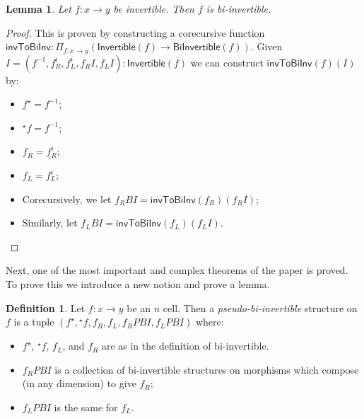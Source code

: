 \documentclass{article}
\newtheorem{lemma}{Lemma}
\theoremstyle{definition}
\newtheorem{definition}{Definition}
\theoremstyle{remark}
\newcommand{\linv}[1]{{}^\star\!#1}
\newcommand{\rinv}[1]{#1^\star}
\newcommand{\inv}[1]{#1^{-1}}
\begin{document}
\begin{lemma}\label{inv-to-bi-inv}
  Let \(f : x \to y\) be invertible. Then \(f\) is bi-invertible.
\end{lemma}

\begin{proof}
  This is proven by constructing a corecursive function \(\mathsf{invToBiInv} : \Pi_{f : x \to y} (\mathsf{Invertible}(f) \to \mathsf{BiInvertible}(f))\). Given \(I = (\inv f,f_R^i,f_L^i,f_R{}I, f_L{}I) : \mathsf{Invertible}(f)\) we can construct \(\mathsf{invToBiInv}(f)(I)\) by:
  \begin{itemize}
  \item \(\rinv f = \inv f\);
  \item \(\linv f = \inv f\);
  \item \(f_R = f_R^i\);
  \item \(f_L = f_L^i\);
  \item Corecursively, we let \(f_R{}BI = \mathsf{invToBiInv}(f_R)(f_R{}I)\);
  \item Similarly, let \(f_L{}BI = \mathsf{invToBiInv}(f_L)(f_L{}I)\).
  \end{itemize}
\end{proof}

\noindent Next, one of the most important and complex theorems of the paper is proved. To prove this we introduce a new notion and prove a lemma.

\begin{definition}
  Let \(f : x \to y\) be an \(n\) cell. Then a \emph{pseudo-bi-invertible} structure on \(f\) is a tuple \((\rinv f, \linv f, f_R, f_L, f_R{}PBI, f_L{}PBI)\) where:
  \begin{itemize}
  \item \(\rinv f\), \(\linv f\), \(f_L\), and \(f_R\) are as in the definition of bi-invertible.
  \item \(f_R{}PBI\) is a collection of bi-invertible structures on morphisms which compose (in any dimension) to give \(f_R\);
  \item \(f_L{}PBI\) is the same for \(f_L\).
  \end{itemize}
\end{definition}
\end{document}
